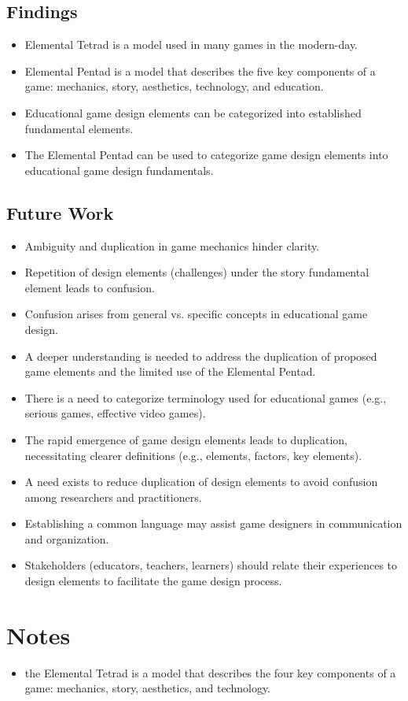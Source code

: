\subsection{Findings}
\begin{itemize}
    \item Elemental Tetrad is a model used in many games in the modern-day.
    \item Elemental Pentad is a model that describes the five key components of a game: mechanics, story, aesthetics, technology, and education.
    \item Educational game design elements can be categorized into established fundamental elements.
    \item The Elemental Pentad can be used to categorize game design elements into educational game design fundamentals.
\end{itemize}


\subsection{Future Work}
\begin{itemize}
    \item Ambiguity and duplication in game mechanics hinder clarity.
    \item Repetition of design elements (challenges) under the story fundamental element leads to confusion.
    \item Confusion arises from general vs. specific concepts in educational game design.
    \item A deeper understanding is needed to address the duplication of proposed game elements and the limited use of the Elemental Pentad.
    \item There is a need to categorize terminology used for educational games (e.g., serious games, effective video games).
    \item The rapid emergence of game design elements leads to duplication, necessitating clearer definitions (e.g., elements, factors, key elements).
    \item A need exists to reduce duplication of design elements to avoid confusion among researchers and practitioners.
    \item Establishing a common language may assist game designers in communication and organization.
    \item Stakeholders (educators, teachers, learners) should relate their experiences to design elements to facilitate the game design process.
\end{itemize}
    

\section{Notes}
\begin{itemize}
\item the Elemental Tetrad is a model that describes the four key components of a game: mechanics, story, aesthetics, and technology.

\end{itemize}
